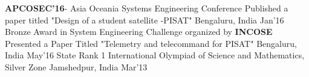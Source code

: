 \begin{cvhonors}
	\cvhonor
	{\textbf{APCOSEC'16}- Asia Oceania Systems Engineering Conference}
	{Published a paper titled "Design of a student satellite -PISAT"}
	{Bengaluru, India}
	{Jan'16}
	\cvhonor
	{Bronze Award in System Engineering Challenge organized by \textbf{INCOSE}}
	{Presented a Paper Titled "Telemetry and telecommand for PISAT"}
	{Bengaluru, India}
	{May'16}
	\cvhonor
	{State Rank 1}
	{International Olympiad of Science and Mathematics, Silver Zone}
	{Jamshedpur, India}
	{Mar'13}
\end{cvhonors}
